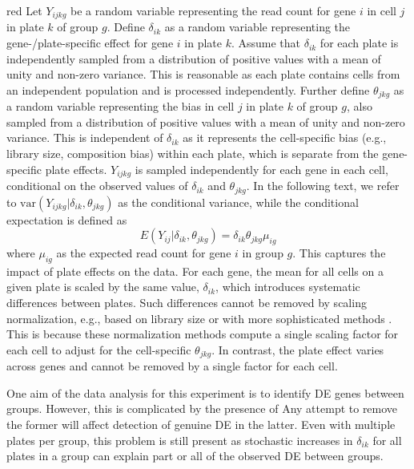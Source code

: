 \documentclass[oupdraft]{bio}
\begin{document}
\begin{color}{red}
Let $Y_{ijkg}$ be a random variable representing the read count for gene $i$ in cell $j$ in plate $k$ of group $g$.
Define $\delta_{ik}$ as a random variable representing the gene-/plate-specific effect for gene $i$ in plate $k$.
Assume that $\delta_{ik}$ for each plate is independently sampled from a distribution of positive values with a mean of unity and non-zero variance.
This is reasonable as each plate contains cells from an independent population and is processed independently.
Further define $\theta_{jkg}$ as a random variable representing the bias in cell $j$ in plate $k$ of group $g$, also sampled from a distribution of positive values with a mean of unity and non-zero variance.
This is independent of $\delta_{ik}$ as it represents the cell-specific bias (e.g., library size, composition bias) within each plate, which is separate from the gene-specific plate effects.
$Y_{ijkg}$ is sampled independently for each gene in each cell, conditional on the observed values of $\delta_{ik}$ and $\theta_{jkg}$.
In the following text, we refer to $\mbox{var}(Y_{ijkg}|\delta_{ik},\theta_{jkg})$ as the conditional variance, while the conditional expectation is defined as
\[
    E(Y_{ij}|\delta_{ik},\theta_{jkg}) = \delta_{ik}\theta_{jkg}\mu_{ig} 
\]
where $\mu_{ig}$ as the expected read count for gene $i$ in group $g$.
This captures the impact of plate effects on the data.
For each gene, the mean for all cells on a given plate is scaled by the same value, $\delta_{ik}$, which introduces systematic differences between plates.
Such differences cannot be removed by scaling normalization, e.g., based on library size or with more sophisticated methods \citep{anders2010differential,robinson2010scaling}.
This is because these normalization methods compute a single scaling factor for each cell to adjust for the cell-specific $\theta_{jkg}$.
In contrast, the plate effect varies across genes and cannot be removed by a single factor for each cell.
\end{color}


One aim of the data analysis for this experiment is to identify DE genes between groups.
However, this is complicated by the presence of 
Any attempt to remove the former will affect detection of genuine DE in the latter.
Even with multiple plates per group, this problem is still present as stochastic increases in $\delta_{ik}$ for all plates in a group can explain part or all of the observed DE between groups.
\end{document}
